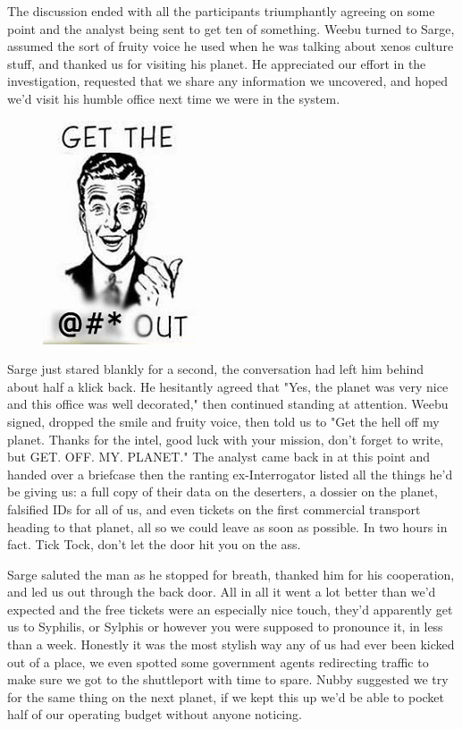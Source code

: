 The discussion ended with all the participants triumphantly agreeing on some point and the analyst being sent to get ten of something. 
Weebu turned to Sarge, assumed the sort of fruity voice he used when he was talking about xenos culture stuff, and thanked us for visiting his planet. 
He appreciated our effort in the investigation, requested that we share any information we uncovered, and hoped we'd visit his humble office next time we were in the system.

\begin{figure}
	\begin{center}
		\includegraphics[width=\figwidth]{pics/10/32.png}
	\end{center}
\end{figure}
Sarge just stared blankly for a second, the conversation had left him behind about half a klick back. 
He hesitantly agreed that "Yes, the planet was very nice and this office was well decorated," then continued standing at attention. 
Weebu signed, dropped the smile and fruity voice, then told us to "Get the hell off my planet. 
Thanks for the intel, good luck with your mission, don't forget to write, but GET. 
OFF. 
MY. 
PLANET." The analyst came back in at this point and handed over a briefcase then the ranting ex-Interrogator listed all the things he'd be giving us: 
a full copy of their data on the deserters, a dossier on the planet, falsified IDs for all of us, and even tickets on the first commercial transport heading to that planet, all so we could leave as soon as possible. 
In two hours in fact. 
Tick Tock, don't let the door hit you on the ass.

Sarge saluted the man as he stopped for breath, thanked him for his cooperation, and led us out through the back door. 
All in all it went a lot better than we'd expected and the free tickets were an especially nice touch, they'd apparently get us to Syphilis, or Sylphis or however you were supposed to pronounce it, in less than a week. 
Honestly it was the most stylish way any of us had ever been kicked out of a place, we even spotted some government agents redirecting traffic to make sure we got to the shuttleport with time to spare. 
Nubby suggested we try for the same thing on the next planet, if we kept this up we'd be able to pocket half of our operating budget without anyone noticing.

